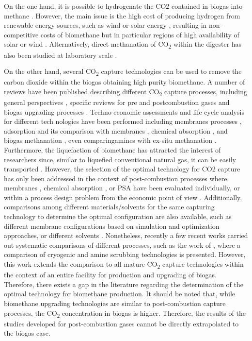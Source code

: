 \begin{refsection}[referencesCh7]
On the one hand, it is possible to hydrogenate the CO2 contained in biogas into methane \citep{stangeland2017co2}. However, the main issue is the high cost of producing hydrogen from renewable energy sources, such as wind \citep{davis2014optimala} or solar energy \citep{davis2014optimalb}, resulting in non-competitive costs of biomethane \citep{curto2019renewable} but in particular regions of high availability of solar or wind \citep{de2016characterization}. Alternatively, direct methanation of CO\textsubscript{2} within the digester has also been studied at laboratory scale \citep{Tynjala}.

On the other hand, several CO\textsubscript{2} capture technologies can be used to remove the carbon dioxide within the biogas obtaining high purity biomethane. A number of reviews have been published describing different CO\textsubscript{2} capture processes, including general perspectives \citep{adamu2020process}, specific reviews for pre and postcombustion gases \citep{macdowell2010overview} and biogas upgrading processes \citep{adnan2019technologies, miltner2017review}. Techno-economic assessments and life cycle analysis for different tech nologies have been performed including membranes processes \citep{fang2018life}, adsorption and its comparison with membranes \citep{giordano2018life}, chemical absorption \citep{morero2017evaluation}, and biogas methanation \citep{curto2019renewable}, even comparingamines  with ex-situ methanation \citep{vo2018techno}. Furthermore, the liquefaction of biomethane has attracted the interest of researchers since, similar to liquefied conventional natural gas, it can be easily transported \citep{qyyum2020biogas}. However, the selection of the optimal technology for CO2 capture has only been addressed in the context of post-combustion processes where membranes \citep{gassner2009integrated}, chemical absorption \citep{hasan2012modelinga}, or PSA \citep{hasan2012modelingb} have been evaluated individually, or within a process design problem from the economic point of view \citep{klemevs2007techno}. Additionally, comparisons among different materials/solvents for the same capturing technology to determine the optimal configuration are also available, such as different membrane configurations based on simulation \citep{makaruk2010membrane} and optimization \citep{gilassi2019optimizing} approaches, or different solvents \citep{lee2013comparisons}. Nonetheless, recently a few recent works carried out systematic comparisons of different processes, such as the work of \citet{pellegrini2018biogas}, where a comparison of cryogenic and amine scrubbing technologies is presented. However, this work extends the comparison to all mature CO\textsubscript{2} capture technologies within the context of an entire facility for production and upgrading of biogas. Therefore, there exists a gap in the literature regarding the determination of the optimal technology for biomethane production. It should be noted that, while biomethane upgrading technologies are similar to post-combustion capture processes, the CO\textsubscript{2} concentration in biogas is higher. Therefore, the results of the studies developed for post-combustion gases cannot be directly extrapolated to the biogas case.


\end{refsection}
